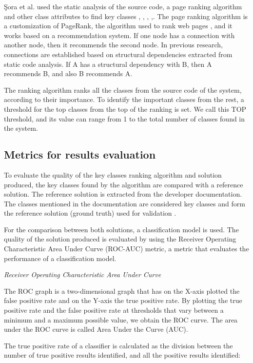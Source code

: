 \documentclass[runningheads]{comsis2}
\begin{document}
Şora et al. used the static analysis of the source code, a page ranking algorithm and other class attributes to find key classes \cite{PagerankENASE}, \cite{enase15}, \cite{SoraSpringer}, \cite{PagerankSACI},\cite{Finding-key-classes}.
The page ranking algorithm is a customization of PageRank, the algorithm used to rank web pages \cite{ilprints422}, and it works based on a recommendation system. If one node has a connection with another node, then it recommends the second node. In previous research, connections are established based on structural dependencies extracted from static code analysis. If A has a structural dependency with B, then A recommends B, and also B recommends A.

The ranking algorithm ranks all the classes from the source code of the system, according to their importance. To identify the important classes from the rest, a threshold for the top classes from the top of the ranking is set. We call this TOP threshold, and its value can range from 1 to the total number of classes found in the system. 

\subsection{Metrics for results evaluation}
\label{sec:evalmetrics}
To evaluate the quality of the key classes ranking algorithm and solution produced, the key classes found by the algorithm are compared with a reference solution. The reference solution is extracted from the developer documentation. The classes mentioned in the documentation are considered key classes and form the reference solution (ground truth) used for validation \cite{7551990}.

For the comparison between both solutions, a classification model is used. The quality of the solution produced is evaluated by using the Receiver Operating Characteristic Area Under Curve (ROC-AUC) metric, a metric that evaluates the performance of a classification model.


\textit{Receiver Operating Characteristic Area Under Curve}


The ROC graph is a two-dimensional graph that has on the X-axis plotted the false positive rate and on the Y-axis the true positive rate. By plotting the true positive rate and the false positive rate at thresholds that vary between a minimum and a maximum possible value, we obtain the ROC curve. The area under the ROC curve is called Area Under the Curve (AUC).

The true positive rate of a classifier is calculated as the division between the number of true positive results identified, and all the positive results identified:
\end{document}
